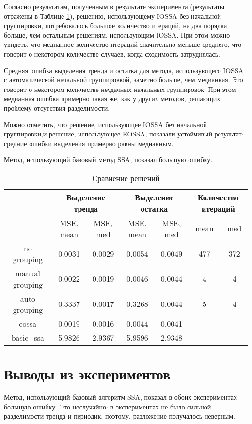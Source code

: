 \documentclass[specialist, substylefile = spbureport.rtx, subf,href,colorlinks=true, 12pt]{disser}
\theoremstyle{definition}
\begin{document}
Согласно результатам, полученным в результате эксперимента (результаты отражены в Таблице \ref{tabular:2}), решению, использующему IOSSA без начальной группировки, потребовалось большое количество итераций, на два порядка больше, чем остальным решениям, использующим IOSSA. При этом можно увидеть, что медианное количество итераций значительно меньше среднего, что говорит о некотором количестве случаев, когда сходимость затруднялась.

Средняя ошибка выделения тренда и остатка для метода, использующего IOSSA с автоматической начальной группировкой, заметно больше, чем медианная. Это говорит о некотором количестве неудачных начальных группировок. При этом медианная ошибка примерно такая же, как у других методов, решающих проблему отсутствия разделимости.

Можно отметить, что решение, использующее IOSSA без начальной группировки,и решение, использующее EOSSA, показали устойчивый результат: средние ошибки выделения примерно равны медианным.

Метод, использующий базовый метод SSA, показал большую ошибку.

\begin{table}[H]
\footnotesize
\caption{Сравнение решений}
\label{tabular:2}
\begin{center}
\begin{tabular}{|c | c| c| c| c| c| c|}
\hline
 \multirow{2}{}{}& \multicolumn{2}{c|}{Выделение тренда} & \multicolumn{2}{c|}{Выделение остатка} & \multicolumn{2}{c|}{Количество итераций} \\
 \hline
 & MSE, mean & MSE, med & MSE, mean & MSE, med & mean & med  \\
\hline
no grouping &  0.0031 & 0.0029 & 0.0054 & 0.0049 & 477 & 372 \\
manual grouping & 0.0022 & 0.0019 & 0.0046 & 0.0044 & 4 & 4 \\
auto grouping &  0.3337 & 0.0017 & 0.3268 & 0.0044 & 5 & 4 \\
\hline
eossa &  0.0019 & 0.0016 & 0.0044 & 0.0041 & \multicolumn{2}{c|}{-} \\
basic\_ssa &  5.9826 & 2.9367 & 5.9596 & 2.9348 & \multicolumn{2}{c|}{-} \\
\hline
\end{tabular}
\end{center}
\end{table}

\section{Выводы из экспериментов}
Метод, использующий базовый алгоритм SSA, показал в обоих экспериментах большую ошибку. Это неслучайно: в экспериментах не было сильной разделимости тренда и периодик, поэтому, разложение получалось неверным.
\end{document}
